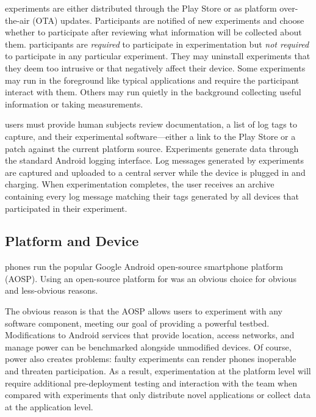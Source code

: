 \PhoneLab{} experiments are either distributed through the Play Store or as
platform over-the-air (OTA) updates. Participants are notified of new
experiments and choose whether to participate after reviewing what
information will be collected about them. \PhoneLab{} participants are
\textit{required} to participate in experimentation but \textit{not required}
to participate in any particular experiment. They may uninstall experiments
that they deem too intrusive or that negatively affect their device. Some
experiments may run in the foreground like typical applications and require
the participant interact with them. Others may run quietly in the background
collecting useful information or taking measurements.

\PhoneLab{} users must provide human subjects review documentation, a list of
log tags to capture, and their experimental software---either a link to the
Play Store or a patch against the current \PhoneLab{} platform source.
Experiments generate data through the standard Android logging interface. Log
messages generated by \PhoneLab{} experiments are captured and uploaded to a
central server while the device is plugged in and charging. When
experimentation completes, the user receives an archive containing every log
message matching their tags generated by all \PhoneLab{} devices that
participated in their experiment.

\subsection{Platform and Device}

\PhoneLab{} phones run the popular Google Android open-source smartphone
platform (AOSP). Using an open-source platform for \PhoneLab{} was an obvious
choice for obvious and less-obvious reasons.

The obvious reason is that the AOSP allows \PhoneLab{} users to experiment
with any software component, meeting our goal of providing a powerful
testbed. Modifications to Android services that provide location, access
networks, and manage power can be benchmarked alongside unmodified devices.
Of course, power also creates problems: faulty experiments can render phones
inoperable and threaten participation. As a result, experimentation at the
platform level will require additional pre-deployment testing and interaction
with the \PhoneLab{} team when compared with experiments that only distribute
novel applications or collect data at the application level.

